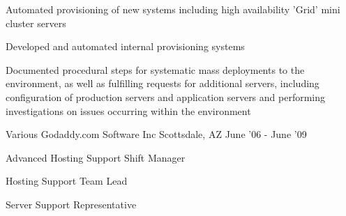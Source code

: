 \begin{cventries}
{\begin{cvitems}
          \item Automated provisioning of new systems including high availability 'Grid' mini cluster servers
          \item Developed and automated internal provisioning systems
          \item Documented procedural steps for systematic mass deployments to the environment, as well as fulfilling requests for additional servers, including configuration of production servers and application servers and performing investigations on issues occurring within the environment
        \end{cvitems}
    }
\vspace{4mm}
\cventry
    {Various} %
    {Godaddy.com Software Inc} %
    {Scottsdale, AZ} %
    {June '06 - June '09} %
    {
        \begin{cvitems}
          \item Advanced Hosting Support Shift Manager
          \item Hosting Support Team Lead
          \item Server Support Representative
        \end{cvitems}
    }
\end{cventries}
